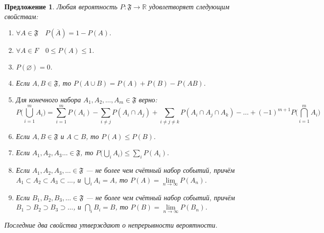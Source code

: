 \documentclass[11pt,openany,a4paper]{scrartcl}
\theoremstyle{plain}
\newtheorem{proposition}[theorem]{Предложение}
\theoremstyle{definition}
\newcommand\mb{\mathbb}
\newcommand\real{\mb R}
\newcommand{\ol}{\overline}
\begin{document}
\begin{proposition}
    Любая вероятность $P: \mathfrak F \to \real$ удовлетворяет следующим свойствам:
    \begin{enumerate}
        \item $\forall A \in \mathfrak F\quad P(\ol A) = 1 - P(A)$.
        \item $\forall A \in F \quad 0 \leqslant P(A) \leqslant 1$.
        \item $P(\varnothing) = 0$.
        \item Если $A, B \in \mathfrak F$, то $P(A \cup B) = P(A) + P(B) - P(AB)$.
        \item Для конечного набора $A_1, A_2, \ldots, A_m \in \mathfrak F$ верно:
        $$
        P\bigg(\bigcup\limits_{i=1}^m A_i\bigg) = \sum\limits_{i=1}^m P(A_i) -
        \sum\limits_{i \neq j} P(A_i \cap A_j) +
        \sum\limits_{i \neq j \neq k} P(A_i \cap A_j \cap A_k) - \ldots +
        (-1)^{m+1} P\bigg(\bigcap\limits_{i=1}^m A_i\bigg)
        $$
        \item Если $A, B \in \mathfrak F$ и $A \subset B$, то $P(A) \leqslant P(B)$.
        \item Если $A_1, A_2, A_3 \ldots \in \mathfrak F$, то
        $P\Big(\bigcup\limits_i A_i\Big) \leqslant \sum\limits_i P(A_i)$.
        \item Если $A_1, A_2, A_3, \ldots \in \mathfrak F$ — не более чем счётный набор событий,
        причём $A_1 \subset A_2 \subset A_3 \subset \ldots$, и $\bigcup\limits_i A_i = A$,
        то $P(A) = \lim\limits_{n \to \infty} P(A_n)$.
        \item Если $B_1, B_2, B_3, \ldots \in \mathfrak F$ — не более чем счётный набор событий,
        причём $B_1 \supset B_2 \supset B_3 \supset \ldots$, и $\bigcap\limits_i B_i = B$,
        то $P(B) = \lim\limits_{n \to \infty} P(B_n)$.
    \end{enumerate}
    
    Последние два свойства утверждают о непрерывности вероятности.
\end{proposition}
\end{document}
